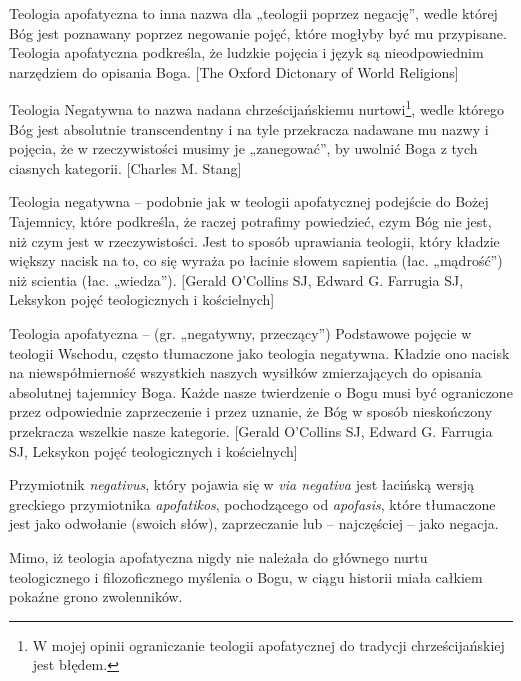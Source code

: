 \begin{defin}
Teologia apofatyczna to inna nazwa dla „teologii poprzez negację”, wedle
której Bóg jest poznawany poprzez negowanie pojęć, które mogłyby być mu
przypisane. Teologia apofatyczna podkreśla, że ludzkie pojęcia i język
są nieodpowiednim narzędziem do opisania Boga. [The Oxford Dictonary of
World Religions]
\end{defin}

\begin{defin}
Teologia Negatywna to nazwa nadana chrześcijańskiemu nurtowi\footnote{W
mojej opinii ograniczanie teologii apofatycznej do tradycji
chrześcijańskiej jest błędem. }, wedle którego Bóg jest absolutnie
transcendentny i na tyle przekracza nadawane mu nazwy i pojęcia, że w
rzeczywistości musimy je „zanegować”, by uwolnić Boga z tych ciasnych
kategorii. [Charles M. Stang]
\end{defin}

\begin{defin}
Teologia negatywna -- podobnie jak w teologii apofatycznej podejście do
Bożej Tajemnicy, które podkreśla, że raczej potrafimy powiedzieć, czym
Bóg nie jest, niż czym jest w rzeczywistości. Jest to sposób uprawiania
teologii, który kładzie większy nacisk na to, co się wyraża po łacinie
słowem sapientia (łac. „mądrość”) niż scientia (łac. „wiedza”). [Gerald
O'Collins SJ, Edward G. Farrugia SJ, Leksykon pojęć
teologicznych i kościelnych]
\end{defin}

\begin{defin}
Teologia apofatyczna -- (gr. „negatywny, przeczący”) Podstawowe pojęcie w
teologii Wschodu, często tłumaczone jako teologia negatywna. Kładzie
ono nacisk na niewspółmierność wszystkich naszych wysiłków
zmierzających do opisania absolutnej tajemnicy Boga. Każde nasze
twierdzenie o Bogu musi być ograniczone przez odpowiednie zaprzeczenie
i przez uznanie, że Bóg w sposób nieskończony przekracza wszelkie nasze
kategorie. [Gerald O'Collins SJ, Edward G. Farrugia
SJ, Leksykon pojęć teologicznych i kościelnych]
\end{defin}

Przymiotnik \textit{negativus}, który pojawia się w \textit{via
negativa} jest łacińską wersją greckiego przymiotnika
\textit{apofatikos}, pochodzącego od \textit{apofasis}, które
tłumaczone jest jako odwołanie (swoich słów), zaprzeczanie lub –
najczęściej -- jako negacja.

Mimo, iż teologia apofatyczna nigdy nie należała do głównego nurtu
teologicznego i filozoficznego myślenia o Bogu, w ciągu historii miała
całkiem pokaźne grono zwolenników.

